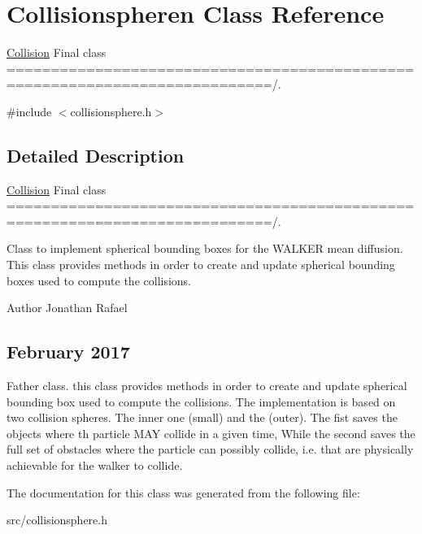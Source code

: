 \hypertarget{class_collisionspheren}{}\section{Collisionspheren Class Reference}
\label{class_collisionspheren}


\hyperlink{class_collision}{Collision} Final class ============================================================================/.  




{\ttfamily \#include $<$collisionsphere.\+h$>$}



\subsection{Detailed Description}
\hyperlink{class_collision}{Collision} Final class ============================================================================/. 

Class to implement spherical bounding boxes for the W\+A\+L\+K\+ER mean diffusion. This class provides methods in order to create and update spherical bounding boxes used to compute the collisions. \begin{DoxyAuthor}{Author}
Jonathan Rafael \subsection*{February 2017 }
\end{DoxyAuthor}


Father class. this class provides methods in order to create and update spherical bounding box used to compute the collisions. The implementation is based on two collision spheres. The inner one (small) and the (outer). The fist saves the objects where th particle M\+AY collide in a given time, While the second saves the full set of obstacles where the particle can possibly collide, i.\+e. that are physically achievable for the walker to collide. 

The documentation for this class was generated from the following file\+:\begin{DoxyCompactItemize}
\item 
src/collisionsphere.\+h\end{DoxyCompactItemize}
